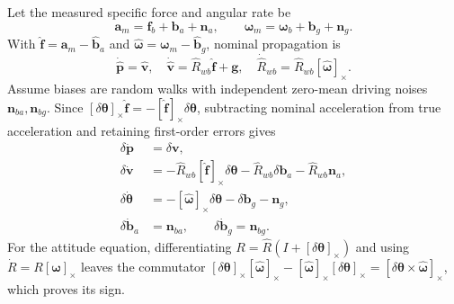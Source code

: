 Let the measured specific force and angular rate be
\begin{equation}
 \boldsymbol a_m=\boldsymbol f_b+\boldsymbol b_a+\boldsymbol n_a,
 \qquad\boldsymbol\omega_m=\boldsymbol\omega_b+
                  \boldsymbol b_g+\boldsymbol n_g.
\end{equation}
With $\widehat{\boldsymbol f}=\boldsymbol a_m-\widehat{\boldsymbol b}_a$
and $\widehat{\boldsymbol\omega}=\boldsymbol\omega_m-
\widehat{\boldsymbol b}_g$, nominal propagation is
\begin{equation}
 \dot{\widehat{\boldsymbol p}}=\widehat{\boldsymbol v},\quad
 \dot{\widehat{\boldsymbol v}}=\widehat R_{wb}\widehat{\boldsymbol f}
                       +\boldsymbol g,\quad
 \dot{\widehat R}_{wb}=\widehat R_{wb}[\widehat{\boldsymbol\omega}]_\times.
\end{equation}
Assume biases are random walks with independent zero-mean driving noises
$\boldsymbol n_{ba},\boldsymbol n_{bg}$. Since
$[\delta\boldsymbol\theta]_\times\widehat{\boldsymbol f}
=-[\widehat{\boldsymbol f}]_\times\delta\boldsymbol\theta$,
subtracting nominal acceleration from true acceleration and retaining
first-order errors gives
\begin{align}
 \delta\dot{\boldsymbol p}&=\delta\boldsymbol v,\\
 \delta\dot{\boldsymbol v}&=-\widehat R_{wb}
       [\widehat{\boldsymbol f}]_\times\delta\boldsymbol\theta
       -\widehat R_{wb}\delta\boldsymbol b_a-\widehat R_{wb}\boldsymbol n_a,\\
 \delta\dot{\boldsymbol\theta}&=-[\widehat{\boldsymbol\omega}]_\times
       \delta\boldsymbol\theta-\delta\boldsymbol b_g-\boldsymbol n_g,\\
 \delta\dot{\boldsymbol b}_a&=\boldsymbol n_{ba},
 \qquad\delta\dot{\boldsymbol b}_g=\boldsymbol n_{bg}.
 \label{eq:eskf-dynamics}
\end{align}
For the attitude equation, differentiating
$R=\widehat R(I+[\delta\boldsymbol\theta]_\times)$ and using
$\dot R=R[\boldsymbol\omega]_\times$ leaves the commutator
$[\delta\boldsymbol\theta]_\times[\widehat{\boldsymbol\omega}]_\times
-[\widehat{\boldsymbol\omega}]_\times[\delta\boldsymbol\theta]_\times
=[\delta\boldsymbol\theta\times\widehat{\boldsymbol\omega}]_\times$,
which proves its sign.


